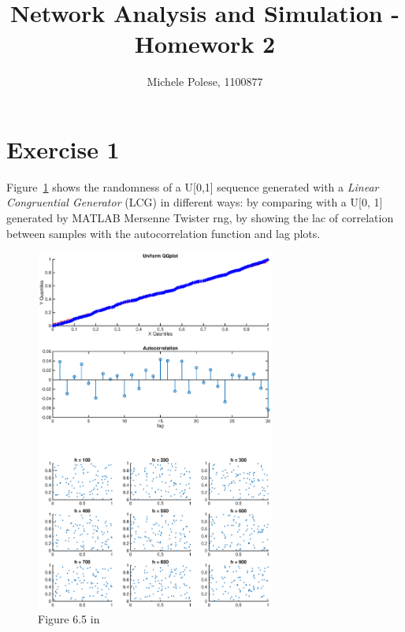 \documentclass[10pt]{article}
\begin{document}
\title{Network Analysis and Simulation - Homework 2}
\author{Michele Polese, 1100877}

\maketitle

\section{Exercise 1}
Figure~\ref{fig:65} shows the randomness of a U[0,1] sequence generated with a \textit{Linear Congruential Generator} (LCG) in different ways: by comparing with a U[0, 1] generated by MATLAB Mersenne Twister rng, by showing the lac of correlation between samples with the autocorrelation function and lag plots.
\begin{figure}
  \centering
  \includegraphics[width=0.7\textwidth]{images/hw2_1_65}
  \caption{Figure 6.5 in \cite{leb}}
  \label{fig:65}
\end{figure}
\end{document}
